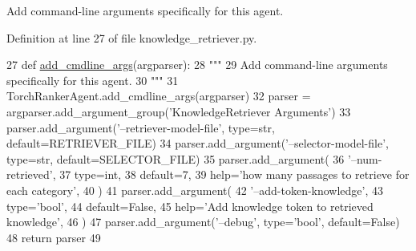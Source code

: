 \begin{DoxyVerb}Add command-line arguments specifically for this agent.
\end{DoxyVerb}
 

Definition at line 27 of file knowledge\+\_\+retriever.\+py.


\begin{DoxyCode}
27     \textcolor{keyword}{def }\hyperlink{namespaceparlai_1_1agents_1_1drqa_1_1config_a62fdd5554f1da6be0cba185271058320}{add\_cmdline\_args}(argparser):
28         \textcolor{stringliteral}{"""}
29 \textcolor{stringliteral}{        Add command-line arguments specifically for this agent.}
30 \textcolor{stringliteral}{        """}
31         TorchRankerAgent.add\_cmdline\_args(argparser)
32         parser = argparser.add\_argument\_group(\textcolor{stringliteral}{'KnowledgeRetriever Arguments'})
33         parser.add\_argument(\textcolor{stringliteral}{'--retriever-model-file'}, type=str, default=RETRIEVER\_FILE)
34         parser.add\_argument(\textcolor{stringliteral}{'--selector-model-file'}, type=str, default=SELECTOR\_FILE)
35         parser.add\_argument(
36             \textcolor{stringliteral}{'--num-retrieved'},
37             type=int,
38             default=7,
39             help=\textcolor{stringliteral}{'how many passages to retrieve for each category'},
40         )
41         parser.add\_argument(
42             \textcolor{stringliteral}{'--add-token-knowledge'},
43             type=\textcolor{stringliteral}{'bool'},
44             default=\textcolor{keyword}{False},
45             help=\textcolor{stringliteral}{'Add knowledge token to retrieved knowledge'},
46         )
47         parser.add\_argument(\textcolor{stringliteral}{'--debug'}, type=\textcolor{stringliteral}{'bool'}, default=\textcolor{keyword}{False})
48         \textcolor{keywordflow}{return} parser
49 
\end{DoxyCode}
\mbox{\label{classprojects_1_1wizard__of__wikipedia_1_1knowledge__retriever_1_1knowledge__retriever_1_1KnowledgeRetrieverAgent_ad7ec946d49376942cfa3a8eff0721014}} 
